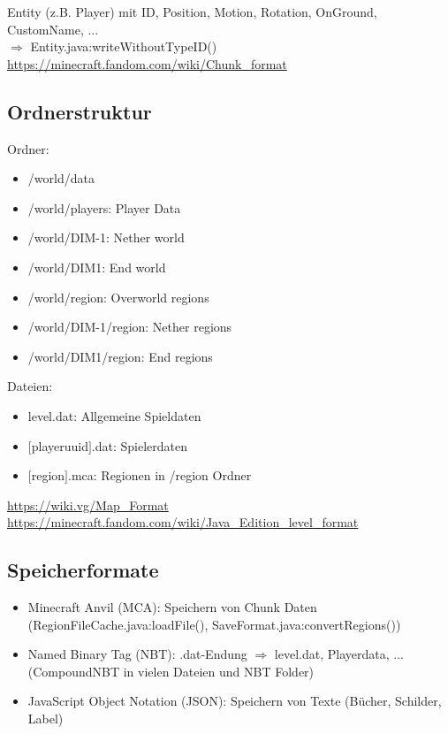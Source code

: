 Entity (z.B. Player) mit ID, Position, Motion, Rotation, OnGround, CustomName, ...\\
$\Rightarrow{}$ Entity.java:writeWithoutTypeID()\\

\url{https://minecraft.fandom.com/wiki/Chunk_format}

\subsection{Ordnerstruktur}
Ordner:
\begin{itemize}
    \item /world/data
    \item /world/players: Player Data
    \item /world/DIM-1: Nether world
    \item /world/DIM1: End world
    \item /world/region: Overworld regions
    \item /world/DIM-1/region: Nether regions
    \item /world/DIM1/region: End regions
\end{itemize}

Dateien:
\begin{itemize}
    \item level.dat: Allgemeine Spieldaten
    \item $[$playeruuid$]$.dat: Spielerdaten
    \item $[$region$]$.mca: Regionen in /region Ordner
\end{itemize}

\url{https://wiki.vg/Map_Format}\\
\url{https://minecraft.fandom.com/wiki/Java_Edition_level_format}

\subsection{Speicherformate}
\begin{itemize}
    \item Minecraft Anvil (MCA): Speichern von Chunk Daten (RegionFileCache.java:loadFile(), SaveFormat.java:convertRegions())
    \item Named Binary Tag (NBT): .dat-Endung $\Rightarrow$ level.dat, Playerdata, ... (CompoundNBT in vielen Dateien und NBT Folder)
    \item JavaScript Object Notation (JSON): Speichern von Texte (Bücher, Schilder, Label)
\end{itemize}

